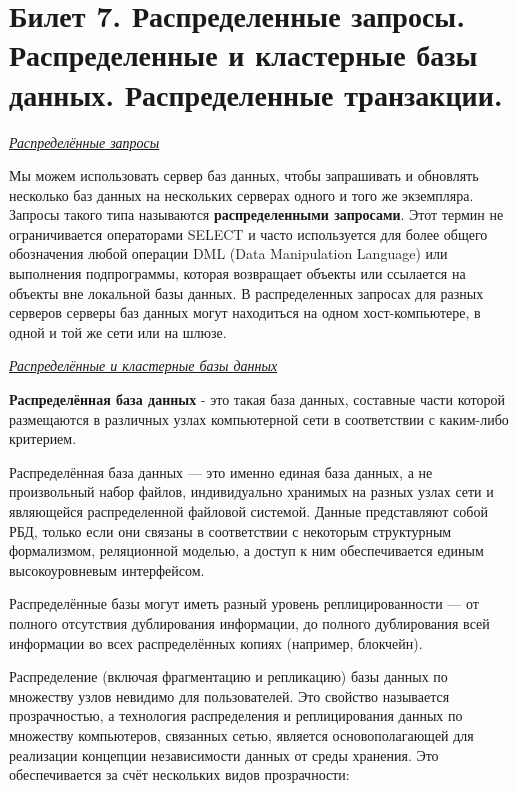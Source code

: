 \newpage
\section {Билет 7. Распределенные запросы. Распределенные и кластерные базы данных. Распределенные транзакции.}

\begin{center}
	\textit{\underline{Распределённые запросы}}
\end{center}

Мы можем использовать сервер баз данных, чтобы запрашивать и обновлять несколько баз данных на нескольких серверах одного и того же экземпляра. Запросы такого типа называются \textbf{распределенными запросами}. Этот термин не ограничивается операторами SELECT и часто используется для более общего обозначения любой операции DML (Data Manipulation Language) или выполнения подпрограммы, которая возвращает объекты или ссылается на объекты вне локальной базы данных.
В распределенных запросах для разных серверов серверы баз данных могут находиться на одном хост-компьютере, в одной и той же сети или на шлюзе.

\begin{center}
	\textit{\underline{Распределённые и кластерные базы данных}}
\end{center}

\textbf{Распределённая база данных} - это такая база данных, составные части которой размещаются в различных узлах компьютерной сети в соответствии с каким-либо критерием.

Распределённая база данных — это именно единая база данных, а не произвольный набор файлов, индивидуально хранимых на разных узлах сети и являющейся распределенной файловой системой. Данные представляют собой РБД, только если они связаны в соответствии с некоторым структурным формализмом, реляционной моделью, а доступ к ним обеспечивается единым высокоуровневым интерфейсом.

Распределённые базы могут иметь разный уровень реплицированности — от полного отсутствия дублирования информации, до полного дублирования всей информации во всех распределённых копиях (например, блокчейн).

Распределение (включая фрагментацию и репликацию) базы данных по множеству узлов невидимо для пользователей. Это свойство называется прозрачностью, а технология распределения и реплицирования данных по множеству компьютеров, связанных сетью, является основополагающей для реализации концепции независимости данных от среды хранения. Это обеспечивается за счёт нескольких видов прозрачности:

